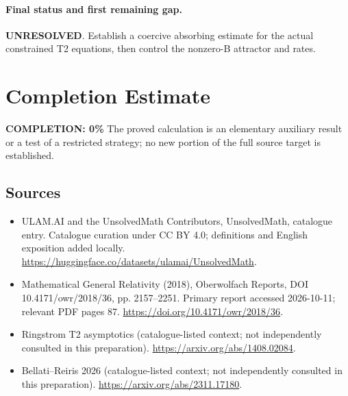 \documentclass[11pt]{article}
\begin{document}
\paragraph{Final status and first remaining gap.}
\textbf{UNRESOLVED}. Establish a coercive absorbing estimate for the actual constrained T2 equations, then control the nonzero-B attractor and rates.

\section{Completion Estimate}
\noindent\textbf{COMPLETION: 0\%}
The proved calculation is an elementary auxiliary result or a test of a restricted strategy; no new portion of the full source target is established.

\subsection{Sources}
\begin{itemize}
\item[\hypertarget{source:statement:1}{S1}] ULAM.AI and the UnsolvedMath Contributors, UnsolvedMath, catalogue entry. Catalogue curation under CC BY 4.0; definitions and English exposition added locally.
\url{https://huggingface.co/datasets/ulamai/UnsolvedMath}.
\item[\hypertarget{source:statement:2}{S2}] Mathematical General Relativity (2018), Oberwolfach Reports, DOI 10.4171/owr/2018/36, pp. 2157--2251. Primary report accessed 2026-10-11; relevant PDF pages 87.
\url{https://doi.org/10.4171/owr/2018/36}.
\item[\hypertarget{source:statement:3}{S3}] Ringstrom T2 asymptotics (catalogue-listed context; not independently consulted in this preparation).
\url{https://arxiv.org/abs/1408.02084}.
\item[\hypertarget{source:statement:4}{S4}] Bellati--Reiris 2026 (catalogue-listed context; not independently consulted in this preparation).
\url{https://arxiv.org/abs/2311.17180}.
\end{itemize}
\label{end:statement}
\end{document}
